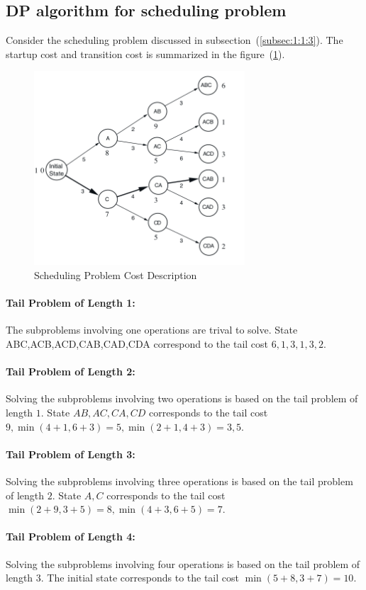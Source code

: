 \subsection{DP algorithm for scheduling problem}
Consider the scheduling problem discussed in subsection~(\ref{subsec:1:1:3}). The startup cost and transition cost is summarized in the figure~(\ref{fig:1:1:4}).
\begin{figure}
\centering
\includegraphics[width = 0.7\textwidth]{First_lecture/p_5}
\caption{Scheduling Problem Cost Description}
\label{fig:1:1:4}
\end{figure}

\paragraph{Tail Problem of Length 1: }
The subproblems involving one operations are trival to solve. State ABC,ACB,ACD,CAB,CAD,CDA correspond to the tail cost $6,1,3,1,3,2$.
\paragraph{Tail Problem of Length 2: }
Solving the subproblems involving two operations is based on the tail problem of length $1$. State $AB,AC,CA,CD$ corresponds to the tail cost $9,\min(4+1,6+3)=5,\min(2+1,4+3)=3,5$.
\paragraph{Tail Problem of Length 3: }
Solving the subproblems involving three operations is based on the tail problem of length $2$. State $A,C$ corresponds to the tail cost $\min(2+9,3+5)=8,\min(4+3,6+5)=7$.
\paragraph{Tail Problem of Length 4: }
Solving the subproblems involving four operations is based on the tail problem of length $3$. The initial state corresponds to the tail cost $\min(5+8,3+7)=10$.

